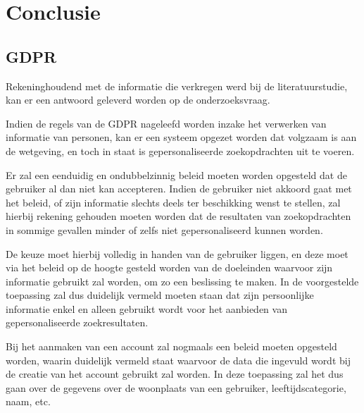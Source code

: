 
\chapter{Conclusie}
\label{ch:conclusie}


\section{GDPR}
\label{sec: Conclusie GDPR}

Rekeninghoudend met de informatie die verkregen werd bij de literatuurstudie, kan er een antwoord geleverd worden op de onderzoeksvraag.

Indien de regels van de GDPR nageleefd worden inzake het verwerken van informatie van personen, kan er een systeem opgezet worden dat volgzaam is aan de wetgeving, en toch in staat is gepersonaliseerde zoekopdrachten uit te voeren. 

Er zal een eenduidig en ondubbelzinnig beleid moeten worden opgesteld dat de gebruiker al dan niet kan accepteren.
 Indien de gebruiker niet akkoord gaat met het beleid, of zijn informatie slechts deels ter beschikking wenst te stellen, zal hierbij rekening gehouden moeten worden dat de resultaten van zoekopdrachten in sommige gevallen minder of zelfs niet gepersonaliseerd kunnen worden.

De keuze moet hierbij volledig in handen van de gebruiker liggen, en deze moet via het beleid op de hoogte gesteld worden van de doeleinden waarvoor zijn informatie gebruikt zal worden, om zo een beslissing te maken. In de voorgestelde toepassing zal dus duidelijk vermeld moeten staan dat zijn persoonlijke informatie enkel en alleen gebruikt wordt voor het aanbieden van gepersonaliseerde zoekresultaten.

Bij het aanmaken van een account zal nogmaals een beleid moeten opgesteld worden, waarin duidelijk vermeld staat waarvoor de data die ingevuld wordt bij de creatie van het account gebruikt zal worden. In deze toepassing zal het dus gaan over de gegevens over de woonplaats van een gebruiker, leeftijdscategorie, naam, etc.

